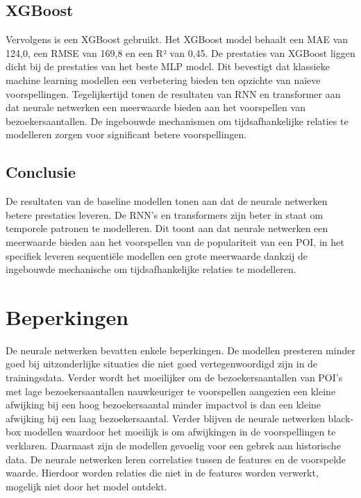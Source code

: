 \subsection{XGBoost}

Vervolgens is een XGBoost gebruikt. Het XGBoost model behaalt een MAE van 124,0, een RMSE van 169,8 en een R² van 0,45. De prestaties van XGBoost liggen dicht bij de prestaties van het beste MLP model. Dit bevestigt dat klassieke machine learning modellen een verbetering bieden ten opzichte van naïeve voorspellingen. Tegelijkertijd tonen de resultaten van RNN en transformer aan dat neurale netwerken een meerwaarde bieden aan het voorspellen van bezoekersaantallen. De ingebouwde mechanismen om tijdsafhankelijke relaties te modelleren zorgen voor significant betere voorspellingen.

\subsection{Conclusie}

De resultaten van de baseline modellen tonen aan dat de neurale netwerken betere prestaties leveren. De RNN’s en transformers zijn beter in staat om temporele patronen te modelleren. Dit toont aan dat neurale netwerken een meerwaarde bieden aan het voorspellen van de populariteit van een POI, in het specifiek leveren sequentiële modellen een grote meerwaarde dankzij de ingebouwde mechanische om tijdsafhankelijke relaties te modelleren.

\section{Beperkingen}
De neurale netwerken bevatten enkele beperkingen. De modellen presteren minder goed bij uitzonderlijke situaties die niet goed vertegenwoordigd zijn in de trainingsdata. Verder wordt het moeilijker om de bezoekersaantallen van POI’s met lage bezoekersaantallen nauwkeuriger te voorspellen aangezien een kleine afwijking bij een hoog bezoekersaantal minder impactvol is dan een kleine afwijking bij een laag bezoekersaantal. Verder blijven de neurale netwerken black-box modellen waardoor het moeilijk is om afwijkingen in de voorspellingen te verklaren. Daarnaast zijn de modellen gevoelig voor een gebrek aan historische data. De neurale netwerken leren correlaties tussen de features en de voorspelde waarde. Hierdoor worden relaties die niet in de features worden verwerkt, mogelijk niet door het model ontdekt.

